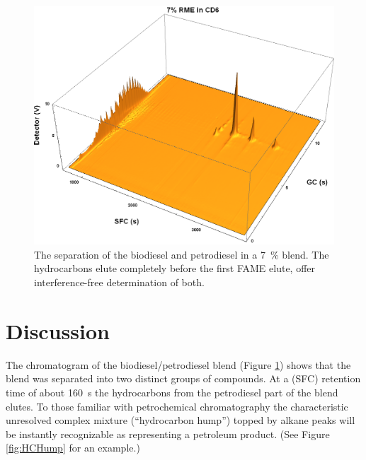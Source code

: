 \begin{figure}
	\centering
	\includegraphics[width=\textwidth]{Figures/PAH_FAMEs.png}
	\decoRule	
	
\caption[Biodiesel separated from petrodiesel.]{The separation of the biodiesel
and petrodiesel in a \SI{7}{\percent} blend. The hydrocarbons elute completely
before the first FAME elute, offer interference-free determination of both.}

	\label{fig:PAH_FAMEs} 
\end{figure}



\section{Discussion}




The chromatogram of the biodiesel/petrodiesel blend (Figure \ref{fig:PAH_FAMEs}) shows
that the blend was separated into two distinct groups of compounds. At a \oneD
(SFC) retention time of about \SI{160}{\second} the hydrocarbons from the
petrodiesel part of the blend elutes. To those familiar with petrochemical
chromatography the characteristic unresolved complex mixture (``hydrocarbon
hump'') topped by alkane peaks will be instantly recognizable as representing
a petroleum product. (See Figure \ref{fig:HCHump} for an example.)


